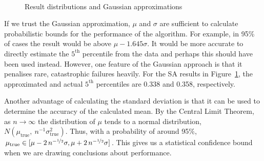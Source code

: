\documentclass[10pt]{article}
\begin{document}
\begin{figure}[tbp]
  \begin{center}
    \mbox{
    }
    \end{center}
    \caption{Result distributions and Gaussian approximations}
    \label{fig:result_dist}
    \end{figure}

If we trust the Gaussian approximation, $\mu$ and $\sigma$ are sufficient to
calculate probabilistic bounds for the performance of the algorithm. For
example, in 95\% of cases the result would be above $\mu - 1.645 \sigma$. It
would be more accurate to directly estimate the $5^\textrm{th}$ percentile
from the data and perhaps this should have been used instead. However, one
feature of the Gaussian approach is that it penalises rare, catastrophic
failures heavily.  For the SA results in Figure~\ref{fig:result_dist}, the
approximated and actual $5^\textrm{th}$  percentiles are 0.338 and 0.358,
respectively.

Another advantage of calculating the standard deviation is that it can be used
to determine the accuracy of the calculated mean. By the Central Limit
Theorem, as $n \rightarrow \infty$ the distribution of $\mu$ tends to a normal
distribution, $N(\mu_\textrm{true},\ n^{-1}\sigma_\textrm{true}^2)$. Thus,
with a probability of around 95\%,
$\mu_\textrm{true} \in
[\mu-2\,n^{-\nicefrac{1}{2}}\sigma, \mu+2\,n^{-\nicefrac{1}{2}}\sigma]$. This
gives us a statistical confidence bound when we are drawing conclusions about
performance.
\end{document}
